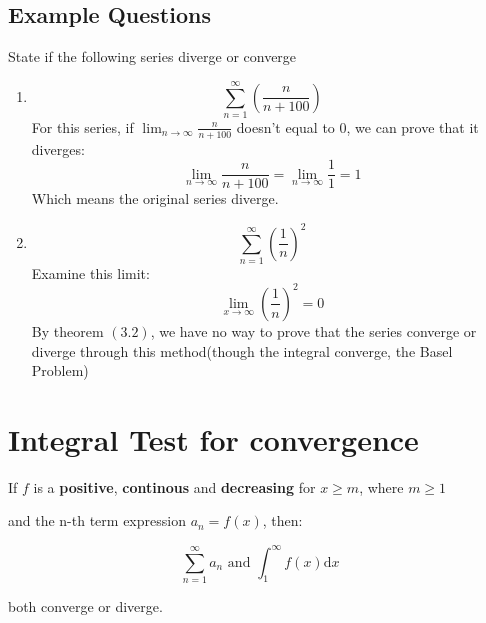 \documentclass{article}
\numberwithin{equation}{section}
\begin{document}
\subsection{Example Questions}
State if the following series diverge or converge
\begin{enumerate}
    \item \[\sum_{n = 1}^{\infty} \left(\frac{n}{n + 100}\right)\]
    For this series, if $\lim_{n\to \infty} \frac{n}{n+100}$ doesn't equal to 0, we can prove that it diverges:
    \[
        \lim_{n\to \infty} \frac{n}{n+100} = \lim_{n\to \infty} \frac{1}{1} = 1
    \]
    Which means the original series diverge.

    \item \[\sum_{n = 1}^{\infty} \left(\frac{1}{n}\right)^2\]
    Examine this limit: 
    \[
        \lim_{x\to \infty} \left(\frac{1}{n}\right)^2 = 0
    \]
    By theorem $(3.2)$, we have no way to prove that the series converge or diverge through this method(though the integral converge, the Basel Problem)
\end{enumerate}

\newpage
\section{Integral Test for convergence}
If $f$ is a \textbf{positive}, \textbf{continous} and \textbf{decreasing} for $x \geq m$, where $m \geq 1$

and the n-th term expression $a_n = f(x)$, then:

\begin{equation}
    \sum_{n = 1}^{\infty} a_n \text{ and } \int_{1}^{\infty} f(x) \mathrm{d}x
\end{equation}

both converge or diverge.
\end{document}
